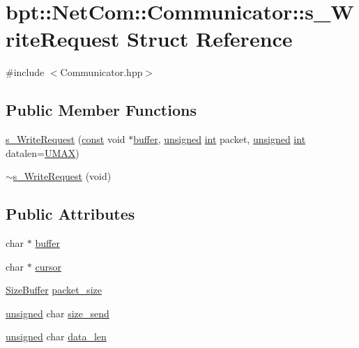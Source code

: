 \hypertarget{structbpt_1_1_net_com_1_1_communicator_1_1s___write_request}{\section{bpt\-:\-:Net\-Com\-:\-:Communicator\-:\-:s\-\_\-\-Write\-Request Struct Reference}
\label{structbpt_1_1_net_com_1_1_communicator_1_1s___write_request}
}


{\ttfamily \#include $<$Communicator.\-hpp$>$}

\subsection*{Public Member Functions}
\begin{DoxyCompactItemize}
\item 
\hyperlink{structbpt_1_1_net_com_1_1_communicator_1_1s___write_request_a8db4897e6a7704f21f7ba9d5206d975d}{s\-\_\-\-Write\-Request} (\hyperlink{term__entry_8h_a57bd63ce7f9a353488880e3de6692d5a}{const} void $\ast$\hyperlink{structbpt_1_1_net_com_1_1_communicator_1_1s___write_request_a93007c3377d5d9413378012f34b04699}{buffer}, \hyperlink{curses_8priv_8h_aca40206900cfc164654362fa8d4ad1e6}{unsigned} \hyperlink{term__entry_8h_ad65b480f8c8270356b45a9890f6499ae}{int} packet, \hyperlink{curses_8priv_8h_aca40206900cfc164654362fa8d4ad1e6}{unsigned} \hyperlink{term__entry_8h_ad65b480f8c8270356b45a9890f6499ae}{int} datalen=\hyperlink{_i_net_access_8hpp_a3376075b6c1085b71a316b5c03838992}{U\-M\-A\-X})
\item 
\hyperlink{structbpt_1_1_net_com_1_1_communicator_1_1s___write_request_a5356f1c81965e70f0a43e9057ff28fac}{$\sim$s\-\_\-\-Write\-Request} (void)
\end{DoxyCompactItemize}
\subsection*{Public Attributes}
\begin{DoxyCompactItemize}
\item 
char $\ast$ \hyperlink{structbpt_1_1_net_com_1_1_communicator_1_1s___write_request_a93007c3377d5d9413378012f34b04699}{buffer}
\item 
char $\ast$ \hyperlink{structbpt_1_1_net_com_1_1_communicator_1_1s___write_request_a95902705972c23c68399519023c629b7}{cursor}
\item 
\hyperlink{classbpt_1_1_net_com_1_1_communicator_ad3c27ccd1f2a96ae2a958e92d01de58d}{Size\-Buffer} \hyperlink{structbpt_1_1_net_com_1_1_communicator_1_1s___write_request_a66ca016d0aff39ac79254a91e2ede07a}{packet\-\_\-size}
\item 
\hyperlink{curses_8priv_8h_aca40206900cfc164654362fa8d4ad1e6}{unsigned} char \hyperlink{structbpt_1_1_net_com_1_1_communicator_1_1s___write_request_a00ea35c36ef36c939728a40a70eb2191}{size\-\_\-send}
\item 
\hyperlink{curses_8priv_8h_aca40206900cfc164654362fa8d4ad1e6}{unsigned} char \hyperlink{structbpt_1_1_net_com_1_1_communicator_1_1s___write_request_a3f03468a662cd908b03933788dcde3bb}{data\-\_\-len}
\end{DoxyCompactItemize}



